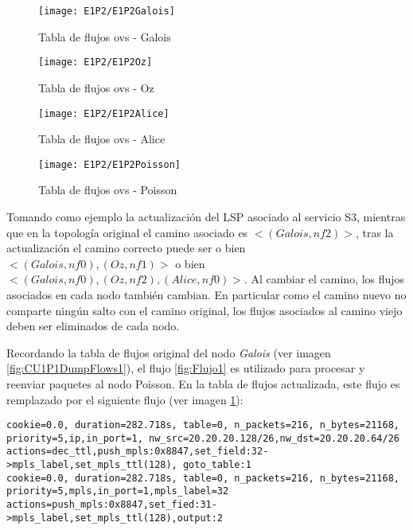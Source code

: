 \begin{figure}[h!] 
\centering    
\texttt{[image: E1P2/E1P2Galois]}
\caption[Tabla de flujos ovs - Galois]{Tabla de flujos ovs - Galois}
\label{fig:CU1P2DumpFlows1}
\end{figure}

\begin{figure}[h!] 
\centering    
\texttt{[image: E1P2/E1P2Oz]}
\caption[Tabla de flujos ovs - Oz]{Tabla de flujos ovs - Oz}
\label{fig:CU1P2DumpFlows2}
\end{figure}

\begin{figure}[h!] 
\centering    
\texttt{[image: E1P2/E1P2Alice]}
\caption[Tabla de flujos ovs - Alice]{Tabla de flujos ovs - Alice}
\label{fig:CU1P2DumpFlows3}
\end{figure}

\newpage
\begin{figure}[ht!] 
\centering    
\texttt{[image: E1P2/E1P2Poisson]}
\caption[Tabla de flujos ovs - Poisson]{Tabla de flujos ovs - Poisson}
\label{fig:CU1P2DumpFlows4}
\end{figure}

Tomando como ejemplo la actualizaci\'on del LSP asociado al servicio S3, mientras que en la topolog\'ia original el camino asociado es $<(Galois, nf2)>$, tras la actualizaci\'on el camino correcto puede ser o bien $<(Galois, nf0),(Oz, nf1)>$ o bien \\ $<(Galois, nf0), (Oz, nf2), (Alice, nf0)>$. Al cambiar el camino, los flujos asociados en cada nodo tambi\'en cambian. En particular como el camino nuevo no comparte ning\'un salto con el camino original, los flujos asociados al camino viejo deben ser eliminados de cada nodo.

Recordando la tabla de flujos original del nodo \textit{Galois} (ver imagen \ref{fig:CU1P1DumpFlows1}), el flujo \ref{fig:Flujo1} es utilizado para procesar y reenviar paquetes al nodo Poisson. En la tabla de flujos actualizada, este flujo es remplazado por el siguiente flujo (ver imagen \ref{fig:CU1P2DumpFlows1}):

\begin{center}
\texttt{cookie=0.0, duration=282.718s, table=0, n\_packets=216, n\_bytes=21168, \\
priority=5,ip,in\_port=1, nw\_src=20.20.20.128/26,nw\_dst=20.20.20.64/26 \\
actions=dec\_ttl,push\_mpls:0x8847,set\_field:32->mpls\_label,set\_mpls\_ttl(128), goto\_table:1 \\
\vspace{0.5cm}
cookie=0.0, duration=282.718s, table=0, n\_packets=216, n\_bytes=21168, \\
priority=5,mpls,in\_port=1,mpls\_label=32 \\
actions=push\_mpls:0x8847,set\_fied:31->mpls\_label,set\_mpls\_ttl(128),output:2}
\end{center}

